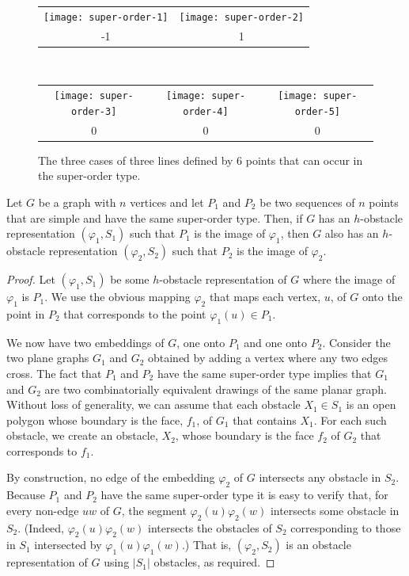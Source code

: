 \documentclass{patmorin}
\begin{document}
\begin{figure}
  \begin{center}
    \begin{tabular}{cc}
       \texttt{[image: super-order-1]} &
       \texttt{[image: super-order-2]} \\ 
       -1 & 1 \\
    \end{tabular}\\[4ex]
    \begin{tabular}{ccc}
       \texttt{[image: super-order-3]} &
       \texttt{[image: super-order-4]} &
       \texttt{[image: super-order-5]} \\
       0 & 0 & 0
    \end{tabular}
  \end{center}
  \caption{The three cases of three lines defined by 6 points that can
      occur in the super-order type.}
\end{figure}

\begin{lem}
  Let $G$ be a graph with $n$ vertices and let $P_1$ and $P_2$ be two
  sequences of $n$ points that are simple and have the same super-order
  type.  Then, if $G$ has an $h$-obstacle representation $(\varphi_1,S_1)$
  such that $P_1$ is the image of $\varphi_1$, then $G$ also has an
  $h$-obstacle representation $(\varphi_2,S_2)$ such that $P_2$ is the
  image of $\varphi_2$.
\end{lem}

\begin{proof}
  Let $(\varphi_1,S_1)$ be some $h$-obstacle representation of $G$
  where the image of $\varphi_1$ is $P_1$.
  We use the obvious mapping $\varphi_2$ that maps each vertex,
  $u$, of $G$ onto the point in $P_2$ that corresponds to the point
  $\varphi_1(u)\in P_1$.

  We now have two embeddings of $G$, one onto $P_1$ and one onto $P_2$.
  Consider the two plane graphs $G_1$ and $G_2$ obtained by adding a
  vertex where any two edges cross.  The fact that $P_1$
  and $P_2$ have the same super-order type implies that $G_1$ and $G_2$
  are two combinatorially equivalent drawings of the same planar graph.
  Without loss of generality, we can assume that each obstacle $X_1\in
  S_1$ is an open polygon whose boundary is the face, $f_1$, of $G_1$ that
  contains $X_1$.  For each such obstacle, we create an obstacle, $X_2$,
  whose boundary is the face $f_2$ of $G_2$ that corresponds to $f_1$.

  By construction, no edge of the embedding $\varphi_2$ of $G$
  intersects any obstacle in $S_2$.  Because $P_1$ and $P_2$ have the
  same super-order type it is easy to verify that, for every non-edge
  $uw$ of $G$, the segment $\varphi_2(u)\varphi_2(w)$ intersects some
  obstacle in $S_2$. (Indeed, $\varphi_2(u)\varphi_2(w)$ intersects
  the obstacles of $S_2$ corresponding to those in $S_1$ intersected
  by $\varphi_1(u)\varphi_1(w)$.)  That is, $(\varphi_2,S_2)$ is an
  obstacle representation of $G$ using $|S_1|$ obstacles, as required.
\end{proof}
\end{document}

